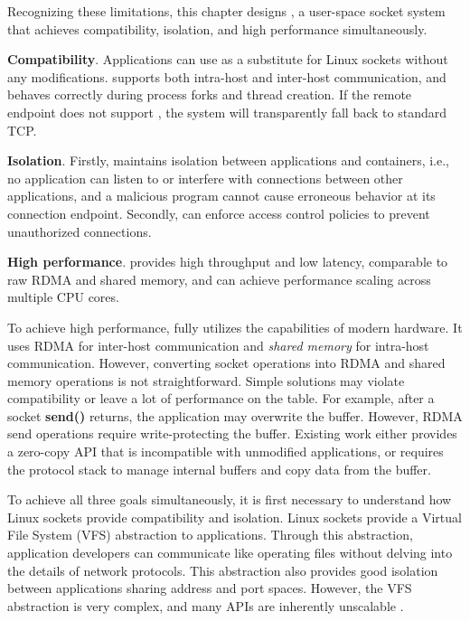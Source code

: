 Recognizing these limitations, this chapter designs \sys{}, a user-space socket system that achieves compatibility, isolation, and high performance simultaneously.
\begin{ecompact}
\item \textbf {Compatibility}.
Applications can use \sys{} as a substitute for Linux sockets without any modifications.
\sys{} supports both intra-host and inter-host communication, and behaves correctly during process forks and thread creation.
If the remote endpoint does not support \sys{}, the system will transparently fall back to standard TCP.
\item \textbf {Isolation}.
Firstly, \sys{} maintains isolation between applications and containers, i.e., no application can listen to or interfere with connections between other applications, and a malicious program cannot cause erroneous behavior at its connection endpoint.
Secondly, \sys{} can enforce access control policies to prevent unauthorized connections.
\item \textbf {High performance}.
\sys{} provides high throughput and low latency, comparable to raw RDMA and shared memory, and can achieve performance scaling across multiple CPU cores.
\end{ecompact}

To achieve high performance, \sys{} fully utilizes the capabilities of modern hardware. It uses RDMA for inter-host communication and \emph {shared memory} for intra-host communication. However, converting socket operations into RDMA and shared memory operations is not straightforward.
Simple solutions may violate compatibility or leave a lot of performance on the table.
For example, after a socket \textbf {send()} returns, the application may overwrite the buffer.
However, RDMA send operations require write-protecting the buffer.
Existing work \cite {rsockets} either provides a zero-copy API that is incompatible with unmodified applications, or requires the protocol stack to manage internal buffers and copy data from the buffer.

To achieve all three goals simultaneously, it is first necessary to understand how Linux sockets provide compatibility and isolation. Linux sockets provide a Virtual File System (VFS) abstraction to applications. Through this abstraction, application developers can communicate like operating files without delving into the details of network protocols. This abstraction also provides good isolation between applications sharing address and port spaces. However, the VFS abstraction is very complex, and many APIs are inherently unscalable \cite {clark1989analysis,boyd2010analysis,jeong2014mtcp}.

